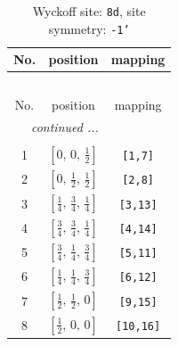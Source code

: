 \documentclass[fleqn,8pt]{jsarticle}
\begin{document}
\begin{longtable}{ccc}
\caption{Wyckoff site: {\tt 8d}, site symmetry: {\tt -1'}}
 \\
 \hline \hline
No. & position & mapping \\ \hline \endfirsthead

\multicolumn{2}{l}{\tablename\ \thetable{}} \\
 \hline \hline
No. & position & mapping \\ \hline \endhead

 \hline \hline
\multicolumn{2}{r}{\footnotesize\it continued ...} \\ \endfoot

 \hline \hline
\multicolumn{2}{r}{} \\ \endlastfoot

1 & $\left[ 0,\, 0,\, \frac{1}{2} \right]$ & {\tt [1,7]} \\ \hline
2 & $\left[ 0,\, \frac{1}{2},\, \frac{1}{2} \right]$ & {\tt [2,8]} \\ \hline
3 & $\left[ \frac{1}{4},\, \frac{3}{4},\, \frac{1}{4} \right]$ & {\tt [3,13]} \\ \hline
4 & $\left[ \frac{3}{4},\, \frac{3}{4},\, \frac{1}{4} \right]$ & {\tt [4,14]} \\ \hline
5 & $\left[ \frac{3}{4},\, \frac{1}{4},\, \frac{3}{4} \right]$ & {\tt [5,11]} \\ \hline
6 & $\left[ \frac{1}{4},\, \frac{1}{4},\, \frac{3}{4} \right]$ & {\tt [6,12]} \\ \hline
7 & $\left[ \frac{1}{2},\, \frac{1}{2},\, 0 \right]$ & {\tt [9,15]} \\ \hline
8 & $\left[ \frac{1}{2},\, 0,\, 0 \right]$ & {\tt [10,16]} \\
\end{longtable}
\renewcommand{\arraystretch}{1.2}
\end{document}
